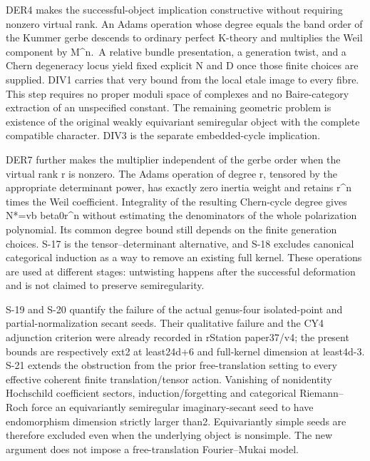 \documentclass[11pt,a4paper]{article}
\theoremstyle{definition}
\begin{document}
DER4 makes the successful-object implication constructive without
requiring nonzero virtual rank. An Adams operation whose degree equals
the band order of the Kummer gerbe descends to ordinary perfect K-theory
and multiplies the Weil component by M\^{}n.~A relative bundle
presentation, a generation twist, and a Chern degeneracy locus yield
fixed explicit N and D once those finite choices are supplied. DIV1
carries that very bound from the local etale image to every fibre. This
step requires no proper moduli space of complexes and no Baire-category
extraction of an unspecified constant. The remaining geometric problem
is existence of the original weakly equivariant semiregular object with
the complete compatible character. DIV3 is the separate embedded-cycle
implication.

DER7 further makes the multiplier independent of the gerbe order when
the virtual rank r is nonzero. The Adams operation of degree
\textbar r\textbar, tensored by the appropriate determinant power, has
exactly zero inertia weight and retains \textbar r\textbar\^{}n times
the Weil coefficient. Integrality of the resulting Chern-cycle degree
gives N*=v\textbar b beta0\textbar\textbar r\textbar\^{}n without
estimating the denominators of the whole polarization polynomial. Its
common degree bound still depends on the finite generation choices. S-17
is the tensor--determinant alternative, and S-18 excludes canonical
categorical induction as a way to remove an existing full kernel. These
operations are used at different stages: untwisting happens after the
successful deformation and is not claimed to preserve semiregularity.

S-19 and S-20 quantify the failure of the actual genus-four
isolated-point and partial-normalization secant seeds. Their qualitative
failure and the CY4 adjunction criterion were already recorded in
rStation paper37/v4; the present bounds are respectively ext2 at
least24d+6 and full-kernel dimension at least4d-3. S-21 extends the
obstruction from the prior free-translation setting to every effective
coherent finite translation/tensor action. Vanishing of nonidentity
Hochschild coefficient sectors, induction/forgetting and categorical
Riemann--Roch force an equivariantly semiregular imaginary-secant seed
to have endomorphism dimension strictly larger than2. Equivariantly
simple seeds are therefore excluded even when the underlying object is
nonsimple. The new argument does not impose a free-translation
Fourier--Mukai model.
\end{document}
